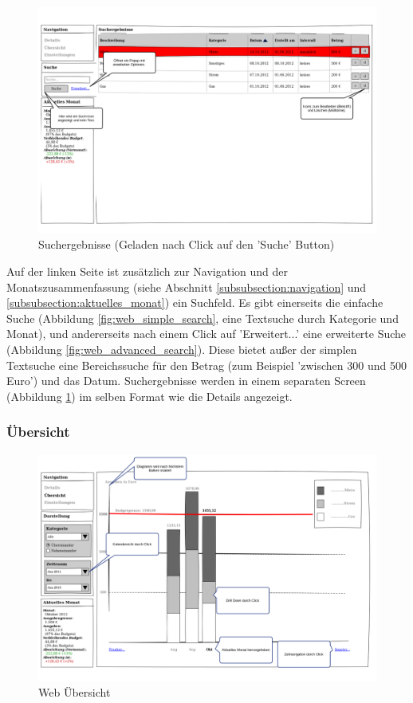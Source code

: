 \begin{figure}[htl]
\centering
\includegraphics[width=\textwidth]{img/web_search}
\caption{Suchergebnisse (Geladen nach Click auf den 'Suche' Button)}
\label{fig:web_search}
\end{figure}

Auf der linken Seite ist zusätzlich zur Navigation und der Monatszusammenfassung (siehe Abschnitt \ref{subsubsection:navigation} und \ref{subsubsection:aktuelles_monat}) ein Suchfeld. Es gibt einerseits die einfache Suche (Abbildung \ref{fig:web_simple_search}, eine Textsuche durch Kategorie und Monat), und andererseits nach einem Click auf
'Erweitert...' eine erweiterte Suche (Abbildung \ref{fig:web_advanced_search}). Diese bietet außer der simplen Textsuche eine Bereichssuche für den Betrag (zum Beispiel 'zwischen 300 und 500 Euro') und das Datum. Suchergebnisse werden in einem separaten Screen (Abbildung \ref{fig:web_search}) im selben Format wie die Details angezeigt.

\subsubsection{Übersicht}

\begin{figure}[htl]
\centering
\includegraphics[width=\textwidth]{img/web_uebersicht}
\caption{Web \"Ubersicht}
\label{fig:web_uebersicht}
\end{figure}

